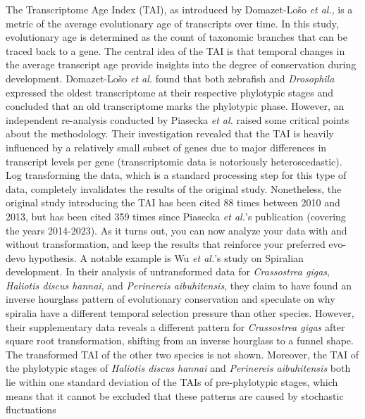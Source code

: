 The Transcriptome Age Index (TAI), as introduced by Domazet-Lošo \textit{et al.}, is a metric of the average evolutionary age of transcripts over time\cite{DomazetLoso2010}. In this study, evolutionary age is determined as the count of taxonomic branches that can be traced back to a gene. The central idea of the TAI is that temporal changes in the average transcript age provide insights into the degree of conservation during development. Domazet-Lošo \textit{et al.} found that both zebrafish and \textit{Drosophila} expressed the oldest transcriptome at their respective phylotypic stages and concluded that an old transcriptome marks the phylotypic phase. However, an independent re-analysis conducted by Piasecka \textit{et al.} raised some critical points about the methodology\cite{Piasecka2013}. Their investigation revealed that the TAI is heavily influenced by a relatively small subset of genes due to major differences in transcript levels per gene (transcriptomic data is notoriously heteroscedastic\cite{Rocke2001}). Log transforming the data, which is a standard processing step for this type of data, completely invalidates the results of the original study. Nonetheless, the original study introducing the TAI has been cited 88 times between 2010 and 2013, but has been cited 359 times since Piasecka \textit{et al.}'s publication (covering the years 2014-2023). As it turns out, you can now analyze your data with and without transformation, and keep the results that reinforce your preferred evo-devo hypothesis. A notable example is Wu \textit{et al.}'s study on Spiralian development\cite{Wu2019}. In their analysis of untransformed data for \textit{Crassostrea gigas}, \textit{Haliotis discus hannai}, and \textit{Perinereis aibuhitensis}, they claim to have found an inverse hourglass pattern of evolutionary conservation and speculate on why spiralia have a different temporal selection pressure than other species. However, their supplementary data reveals a different pattern for \textit{Crassostrea gigas} after square root transformation, shifting from an inverse hourglass to a funnel shape. The transformed TAI of the other two species is not shown. Moreover, the TAI of the phylotypic stages of \textit{Haliotis discus hannai} and \textit{Perinereis aibuhitensis} both lie within one standard deviation of the TAIs of pre-phylotypic stages, which means that it cannot be excluded that these patterns are caused by stochastic fluctuations 

